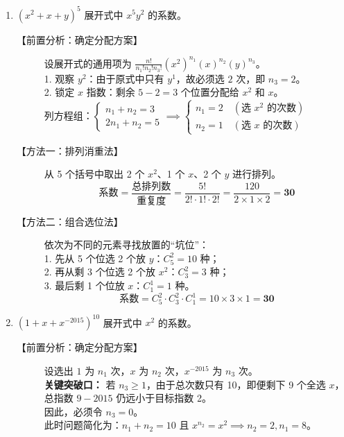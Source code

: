 \documentclass[11pt,a4paper]{article}
\newlength{\myspace}             %
\begin{document}
\begin{enumerate}[label=\arabic*., start=8, leftmargin=1.5em]

    \item $(x^2 + x + y)^5$ 展开式中 $x^5y^2$ 的系数。
    \begin{description}
        \item[【前置分析：确定分配方案】] 
        设展开式的通用项为 $\frac{n!}{n_1! n_2! n_3!} (x^2)^{n_1} (x)^{n_2} (y)^{n_3}$。\\
        1. 观察 $y^2$：由于原式中只有 $y^1$，故必须选 $2$ 次，即 $n_3 = 2$。\\
        2. 锁定 $x$ 指数：剩余 $5-2=3$ 个位置分配给 $x^2$ 和 $x$。\\
        列方程组：$\begin{cases} n_1 + n_2 = 3 \\ 2n_1 + n_2 = 5 \end{cases} \implies \begin{cases} n_1 = 2 \quad (\text{选 } x^2 \text{ 的次数}) \\ n_2 = 1 \quad (\text{选 } x \text{ 的次数}) \end{cases}$

        \item[【方法一：排列消重法】] 
        从 5 个括号中取出 2 个 $x^2$、1 个 $x$、2 个 $y$ 进行排列。\\
        \[ \text{系数} = \frac{\text{总排列数}}{\text{重复度}} = \frac{5!}{2! \cdot 1! \cdot 2!} = \frac{120}{2 \times 1 \times 2} = \mathbf{30} \]

        \item[【方法二：组合选位法】] 
        依次为不同的元素寻找放置的“坑位”：\\
        1. 先从 5 个位选 2 个放 $y$：$C_5^2 = 10$ 种；\\
        2. 再从剩 3 个位选 2 个放 $x^2$：$C_3^2 = 3$ 种；\\
        3. 最后剩 1 个位放 $x$：$C_1^1 = 1$ 种。\\
        \[ \text{系数} = C_5^2 \cdot C_3^2 \cdot C_1^1 = 10 \times 3 \times 1 = \mathbf{30} \]
    \end{description}

    \vspace{\myspace}

    \item $(1 + x + x^{-2015})^{10}$ 展开式中 $x^2$ 的系数。
    \begin{description}
        \item[【前置分析：确定分配方案】] 
        设选出 $1$ 为 $n_1$ 次，$x$ 为 $n_2$ 次，$x^{-2015}$ 为 $n_3$ 次。\\
        \textbf{关键突破口：} 若 $n_3 \geq 1$，由于总次数只有 10，即便剩下 9 个全选 $x$，总指数 $9 - 2015$ 仍远小于目标指数 2。\\
        因此，必须令 $n_3 = 0$。\\
        此时问题简化为：$n_1 + n_2 = 10$ 且 $x^{n_2} = x^2 \implies n_2 = 2, n_1 = 8$。


\end{description}
\end{enumerate}
\end{document}
